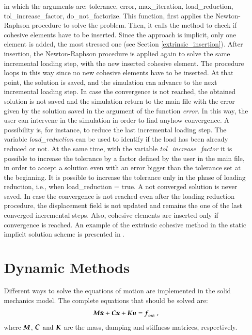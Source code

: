 in which the arguments are: tolerance, error, max\_iteration,
load\_reduction, tol\_increase\_factor, do\_not\_factorize.  This
function, first applies the Newton-Raphson procedure to solve the
problem.  Then, it calls the method  to
check if cohesive elements have to be inserted.  Since the approach is
implicit, only one element is added, the most stressed one (see
Section \ref{extrinsic_insertion}).  After insertion, the
Newton-Raphson procedure is applied again to solve the same
incremental loading step, with the new inserted cohesive element.  The
procedure loops in this way since no new cohesive elements have to be
inserted.  At that point, the solution is saved, and the simulation
can advance to the next incremental loading step.  In case the
convergence is not reached, the obtained solution is not saved and the
simulation return to the main file with the error given by the
solution saved in the argument of the function \emph{error}.  In this
way, the user can intervene in the simulation in order to find anyhow
convergence.  A possibility is, for instance, to reduce the last
incremental loading step.  The variable \emph{load\_reduction} can be
used to identify if the load has been already reduced or not.  At the
same time, with the variable \emph{tol\_increase\_factor} it is
possible to increase the tolerance by a factor defined by the user in
the main file, in order to accept a solution even with an error bigger
than the tolerance set at the beginning.  It is possible to increase
the tolerance only in the phase of loading reduction, i.e., when
load\_reduction = true.  A not converged solution is never saved.  In
case the convergence is not reached even after the loading reduction
procedure, the displacement field is not updated and remains the one
of the last converged incremental steps.  Also, cohesive elements are
inserted only if convergence is reached.  An example of the extrinsic
cohesive method in the static implicit solution scheme is presented in
.

\section{Dynamic Methods} \label{sect:smm:Dynamic_methods}

Different ways to solve the equations of motion are implemented in the
solid mechanics model.  The complete equations that should be solved
are:
\begin{equation}
\label{eqn:equation-motion}
\boldsymbol{M}\ddot{\boldsymbol{u}} +
\boldsymbol{C}\dot{\boldsymbol{u}} + \boldsymbol{K}\boldsymbol{u} = \boldsymbol{f}_{{\mathrm{ext}}}~,
\end{equation}
where $\boldsymbol{M}$, $\boldsymbol{C}$ and $\boldsymbol{K}$ are the mass,
damping and stiffness matrices, respectively.

